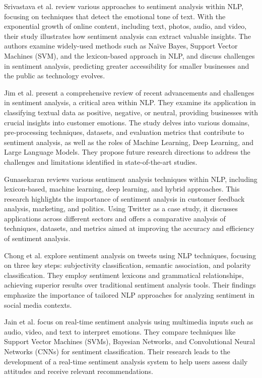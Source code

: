 Srivastava et al.\cite{9242618} review various approaches to sentiment analysis within NLP, focusing on techniques that detect the emotional tone of text. With the exponential growth of online content, including text, photos, audio, and video, their study illustrates how sentiment analysis can extract valuable insights. The authors examine widely-used methods such as Naïve Bayes, Support Vector Machines (SVM), and the lexicon-based approach in NLP, and discuss challenges in sentiment analysis, predicting greater accessibility for smaller businesses and the public as technology evolves.

Jim et al.\cite{JIM2024100059} present a comprehensive review of recent advancements and challenges in sentiment analysis, a critical area within NLP. They examine its application in classifying textual data as positive, negative, or neutral, providing businesses with crucial insights into customer emotions. The study delves into various domains, pre-processing techniques, datasets, and evaluation metrics that contribute to sentiment analysis, as well as the roles of Machine Learning, Deep Learning, and Large Language Models. They propose future research directions to address the challenges and limitations identified in state-of-the-art studies.

Gunasekaran\cite{unknown1} reviews various sentiment analysis techniques within NLP, including lexicon-based, machine learning, deep learning, and hybrid approaches. This research highlights the importance of sentiment analysis in customer feedback analysis, marketing, and politics. Using Twitter as a case study, it discusses applications across different sectors and offers a comparative analysis of techniques, datasets, and metrics aimed at improving the accuracy and efficiency of sentiment analysis.

Chong et al.\cite{7351837} explore sentiment analysis on tweets using NLP techniques, focusing on three key steps: subjectivity classification, semantic association, and polarity classification. They employ sentiment lexicons and grammatical relationships, achieving superior results over traditional sentiment analysis tools. Their findings emphasize the importance of tailored NLP approaches for analyzing sentiment in social media contexts.

Jain et al.\cite{Jain2023} focus on real-time sentiment analysis using multimedia inputs such as audio, video, and text to interpret emotions. They compare techniques like Support Vector Machines (SVMs), Bayesian Networks, and Convolutional Neural Networks (CNNs) for sentiment classification. Their research leads to the development of a real-time sentiment analysis system to help users assess daily attitudes and receive relevant recommendations.

